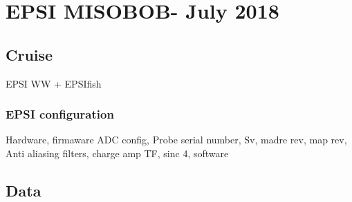 \chapter{EPSI MISOBOB- July 2018}

\section{Cruise}
EPSI WW  + EPSIfish 
\subsection{EPSI configuration}
Hardware, firmaware
ADC config, Probe serial number, Sv, madre rev, map rev, Anti aliasing filters, charge amp TF, sinc 4, software


\section{Data}
